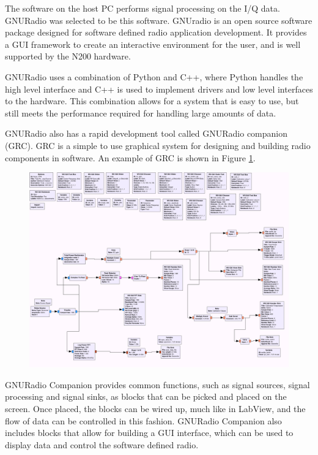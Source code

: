 The software on the host PC performs signal processing on the I/Q data.  GNURadio was selected to be this software.   GNUradio is an open source software package designed for software defined radio application development.  It provides a GUI framework to create an interactive environment for the user, and is well supported by the N200 hardware.  

GNURadio uses a combination of Python and C++, where Python handles the high level interface and C++ is used to implement drivers and low level interfaces to the hardware.  This combination allows for a system that is easy to use, but still meets the performance required for handling large amounts of data. 

GNURadio also has a rapid development tool called GNURadio companion (GRC).  GRC is a simple to use graphical system for designing and building radio components in software. An example of GRC is shown in Figure \ref{N200_GRC}.

{\begin{figure}[h!tb] \centering
\includegraphics[width=\textwidth]{Images/noisesrc_radiometer.png}
\label{N200_GRC}
\end{figure}
}

GNURadio Companion provides common functions, such as signal sources, signal processing and signal sinks, as blocks that can be picked and placed on the screen.  Once placed, the blocks can be wired up, much like in LabView, and the flow of data can be controlled in this fashion.  GNURadio Companion also includes blocks that allow for building a GUI interface, which can be used to display data and control the software defined radio.

